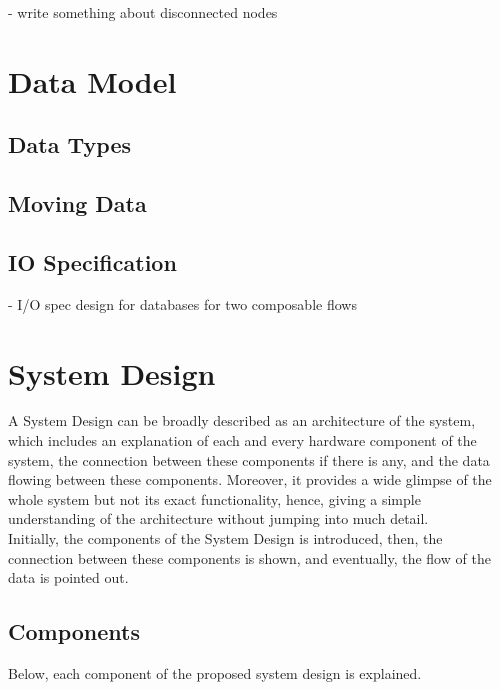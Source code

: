  - write something about disconnected nodes
\\
\section{Data Model}

\subsection{Data Types}


\subsection{Moving Data}

\subsection{IO Specification}
- I/O spec design for databases for two composable flows


\section{System Design }
A System Design can be broadly described as an architecture of the system, which includes an explanation of each and every hardware component of the system, the connection between these components if there is any, and the data flowing between these components. Moreover, it provides a wide glimpse of the whole system but not its exact functionality, hence, giving a simple understanding of the architecture without jumping into much detail.\\
Initially, the components of the System Design is introduced, then, the connection between these components is shown, and eventually, the flow of the data is pointed out.

\subsection{Components}
\label{sub:components}
Below, each component of the proposed system design is explained.

